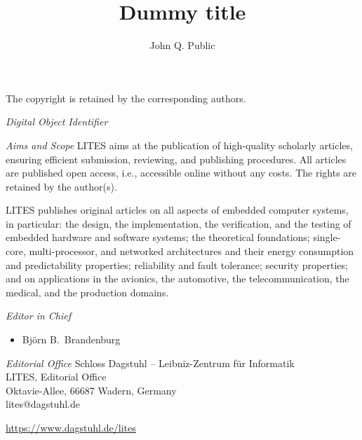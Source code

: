 \documentclass[a4paper,UKenglish]{litesmaster-v2021}
\begin{document}
\begin{publicationinfo}
The copyright is retained by the corresponding authors.

\vfill
\emph{Digital Object Identifier}\newline
\printForewordDOI

\newpage


\bigskip

\emph{Aims and Scope}\newline
LITES aims at the publication of high-quality scholarly articles, ensuring efficient submission, reviewing, and publishing procedures. All articles are published open access, i.e., accessible online without any costs. The rights are retained by the author(s).

\medskip

LITES publishes original articles on all aspects of embedded computer systems, in particular: the design, the implementation, the verification, and the testing of embedded hardware and software systems; the theoretical foundations; single-core, multi-processor, and networked architectures and their energy consumption and predictability properties; reliability and fault tolerance; security properties; and on applications in the avionics, the automotive, the telecommunication, the medical, and the production domains. 

\bigskip

\emph{Editor in Chief}
\begin{itemize}
\item Bj\"orn B.\ Brandenburg
\end{itemize}

\bigskip
\emph{Editorial Office}\newline
Schloss Dagstuhl -- Leibniz-Zentrum f\"ur Informatik\\
LITES, Editorial Office\\
Oktavie-Allee, 66687 Wadern, Germany\\ 
lites@dagstuhl.de


\vfill

\url{https://www.dagstuhl.de/lites}
 
 \thispagestyle{empty}
 \onecolumn
\end{publicationinfo}


\begin{contentslist}

\contitem
\title{Dummy title}
\author{John Q. Public}

\end{contentslist}
\end{document}
